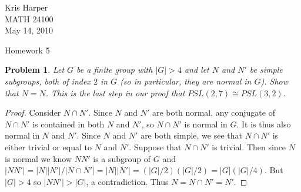 \documentclass{article}
\newtheorem{problem}{Problem}
\begin{document}
\begin{flushright}
Kris Harper\\

MATH 24100\\

May 14, 2010
\end{flushright}

\begin{center}
Homework 5
\end{center}

\begin{problem}
Let $G$ be a finite group with $|G| > 4$ and let $N$ and $N'$ be simple subgroups, both of index $2$ in $G$ (so in particular, they are normal in $G$). Show that $N = N$. This is the last step in our proof that $PSL(2,7) \cong PSL(3,2)$.
\end{problem}
\begin{proof}
Consider $N \cap N'$. Since $N$ and $N'$ are both normal, any conjugate of $N \cap N'$ is contained in both $N$ and $N'$, so $N \cap N'$ is normal in $G$. It is thus also normal in $N$ and $N'$. Since $N$ and $N'$ are both simple, we see that $N \cap N'$ is either trivial or equal to $N$ and $N'$. Suppose that $N \cap N'$ is trivial. Then since $N$ is normal we know $NN'$ is a subgroup of $G$ and $|NN'| = |N||N'|/|N \cap N'| = |N||N'| = (|G|/2)(|G|/2) = |G|(|G|/4)$. But $|G| > 4$ so $|NN'| > |G|$, a contradiction. Thus $N = N \cap N' = N'$.
\end{proof}
\end{document}
